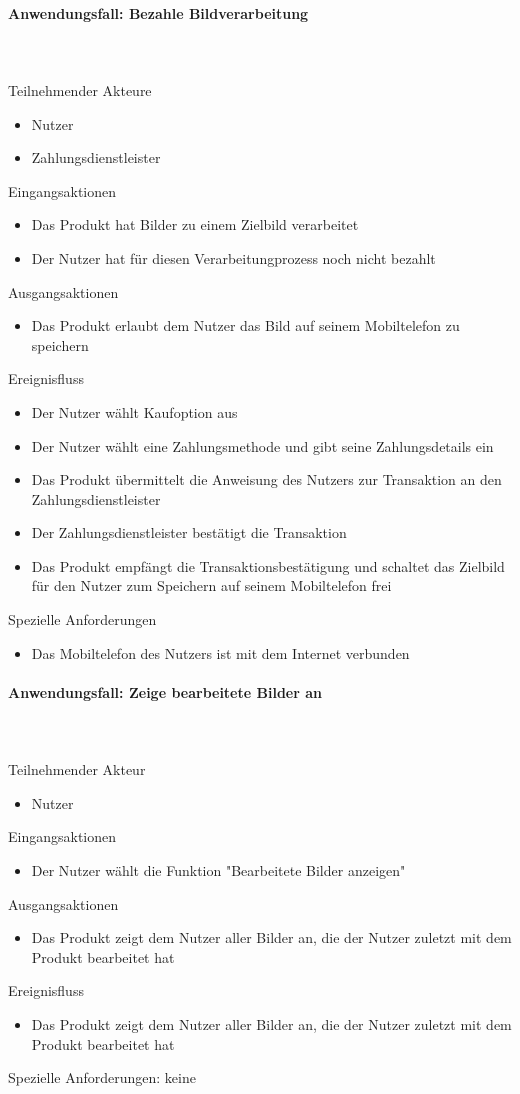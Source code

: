 \documentclass[parskip=full]{scrartcl}
\newcommand{\paragraphashead}[1]{\paragraph{#1}\mbox{}\\\\}
\begin{document}
\paragraphashead{Anwendungsfall: Bezahle Bildverarbeitung}
Teilnehmender Akteure
    \begin{itemize}\setlength\itemsep{-1em}
        \item Nutzer
        \item Zahlungsdienstleister
    \end{itemize}
Eingangsaktionen
	\begin{itemize}\setlength\itemsep{-1em}
    	\item Das Produkt hat Bilder zu einem Zielbild verarbeitet
        \item Der Nutzer hat für diesen Verarbeitungprozess noch nicht bezahlt
    \end{itemize}
Ausgangsaktionen
	\begin{itemize}\setlength\itemsep{-1em}
        \item Das Produkt erlaubt dem Nutzer das Bild auf seinem Mobiltelefon zu speichern
    \end{itemize}
Ereignisfluss
	\begin{itemize}\setlength\itemsep{-1em}
        \item Der Nutzer wählt Kaufoption aus
        \item Der Nutzer wählt eine \gls{Zahlungsmethode} und gibt seine \gls{Zahlungsdetails} ein
        \item Das Produkt übermittelt die Anweisung des Nutzers zur Transaktion an den Zahlungsdienstleister
         \item Der Zahlungsdienstleister bestätigt die Transaktion
         \item Das Produkt empfängt die Transaktionsbestätigung und schaltet das Zielbild für den Nutzer zum Speichern auf seinem Mobiltelefon frei
    \end{itemize}
Spezielle Anforderungen
\begin{itemize}\setlength\itemsep{-1em}
  \item Das Mobiltelefon des Nutzers ist mit dem Internet verbunden
\end{itemize}

\paragraphashead{Anwendungsfall: Zeige bearbeitete Bilder an}
Teilnehmender Akteur
    \begin{itemize}\setlength\itemsep{-1em}
        \item Nutzer
    \end{itemize}
Eingangsaktionen
	\begin{itemize}\setlength\itemsep{-1em}
    	\item Der Nutzer wählt die Funktion "Bearbeitete Bilder anzeigen" 
    \end{itemize}
Ausgangsaktionen
	\begin{itemize}\setlength\itemsep{-1em}
        \item Das Produkt zeigt dem Nutzer aller Bilder an, die der Nutzer zuletzt mit dem Produkt bearbeitet hat
    \end{itemize}
Ereignisfluss
	\begin{itemize}\setlength\itemsep{-1em}
        \item Das Produkt zeigt dem Nutzer aller Bilder an, die der Nutzer zuletzt mit dem Produkt bearbeitet hat
    \end{itemize}
Spezielle Anforderungen: keine
\end{document}
